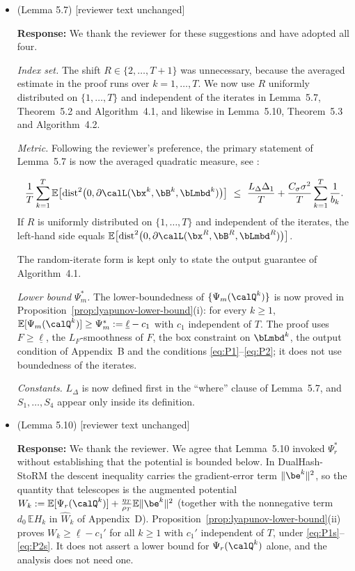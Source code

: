 \begin{itemize}
\item (Lemma 5.7) [reviewer text unchanged]
\par\smallskip
\normalfont\upshape\textbf{Response:}
We thank the reviewer for these suggestions and have adopted all four.

\emph{Index set.} The shift $R\in\{2,\ldots,T+1\}$ was unnecessary, because the averaged estimate in the proof runs over $k=1,\ldots,T$. We now use $R$ uniformly distributed on $\{1,\ldots,T\}$ and independent of the iterates in Lemma~5.7, Theorem~5.2 and Algorithm~4.1, and likewise in Lemma~5.10, Theorem~5.3 and Algorithm~4.2.

\emph{Metric.} Following the reviewer's preference, the primary statement of Lemma~5.7 is now the averaged quadratic measure, see :
\begin{bluequote}
\[
\frac1T\sum_{k=1}^{T}\mathbb{E}\bigl[\operatorname{dist}^2\bigl(0,\partial\calL(\bx^k,\bB^k,\bLmbd^k)\bigr)\bigr]\ \le\ \frac{L_\Delta\Delta_1}{T}+\frac{C_\sigma\sigma^2}{T}\sum_{k=1}^{T}\frac1{b_k}.
\]
If $R$ is uniformly distributed on $\{1,\ldots,T\}$ and independent of the iterates, the left-hand side equals $\mathbb{E}\bigl[\operatorname{dist}^2\bigl(0,\partial\calL(\bx^R,\bB^R,\bLmbd^R)\bigr)\bigr]$.
\end{bluequote}
The random-iterate form is kept only to state the output guarantee of Algorithm~4.1.

\emph{Lower bound $\Psi_m^*$.} The lower-boundedness of $\{\Psi_m(\calQ^k)\}$ is now proved in Proposition~\ref{prop:lyapunov-lower-bound}(i): for every $k\ge1$, $\mathbb{E}[\Psi_m(\calQ^k)]\ge\Psi_m^*:=\underline{\ell}-c_1$ with $c_1$ independent of $T$. The proof uses $F\ge\underline{\ell}$, the $L_F$-smoothness of $F$, the box constraint on $\bLmbd^k$, the output condition of Appendix~B and the conditions \eqref{eq:P1}--\eqref{eq:P2}; it does not use boundedness of the iterates.

\emph{Constants.} $L_\Delta$ is now defined first in the ``where'' clause of Lemma~5.7, and $S_1,\ldots,S_4$ appear only inside its definition.

\item (Lemma 5.10) [reviewer text unchanged]
\par\smallskip
\normalfont\upshape\textbf{Response:}
We thank the reviewer. We agree that Lemma~5.10 invoked $\Psi_r^*$ without establishing that the potential is bounded below. In DualHash-StoRM the descent inequality carries the gradient-error term $\|\be^k\|^2$, so the quantity that telescopes is the augmented potential $W_k:=\mathbb{E}[\Psi_r(\calQ^k)]+\frac{\eta_T}{\rho_T}\mathbb{E}\|\be^k\|^2$ (together with the nonnegative term $d_0\,\mathbb{E}H_k$ in $\widehat W_k$ of Appendix~D). Proposition~\ref{prop:lyapunov-lower-bound}(ii) proves $W_k\ge\underline{\ell}-c_1'$ for all $k\ge1$ with $c_1'$ independent of $T$, under \eqref{eq:P1s}--\eqref{eq:P2s}. It does not assert a lower bound for $\Psi_r(\calQ^k)$ alone, and the analysis does not need one.


\end{itemize}
